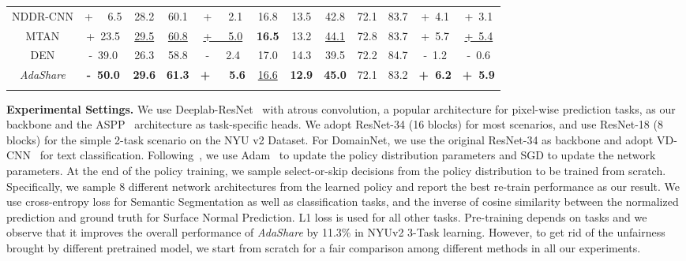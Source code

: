 \begin{table}
\begin{center}
{\begin{tabular}{c|c|ccc|cccccc|c}
            NDDR-CNN & \cellcolor{lightgray!15} + \ \ 6.5 & 28.2	& 60.1&\cellcolor{lightgray!15} +\ \ \ 2.1 & 16.8 & 13.5 & 42.8 & 72.1 
            & 83.7 & \cellcolor{lightgray!15} +\ 4.1 & \cellcolor{lightgray!15} +\ 3.1 \\
            MTAN &\cellcolor{lightgray!15} +\ 23.5 & \underline{29.5}	& \underline{60.8} &\cellcolor{lightgray!15}  \underline{+\ \ \ 5.0} &  \textbf{16.5} & 13.2 & \underline{44.1} & 72.8 & 83.7 & \cellcolor{lightgray!15} +\ 5.7 &\cellcolor{lightgray!15}  \underline{+\ 5.4} \\
            DEN & \cellcolor{lightgray!15} -\ 39.0 & 26.3 & 58.8 & \cellcolor{lightgray!15} -\ \ \  2.4 & 17.0 & 14.3 & 39.5 & 72.2 & 84.7 &\cellcolor{lightgray!15}  -\ 1.2 &\cellcolor{lightgray!15}  -\ 0.6 \\
            \hline
            \textit{AdaShare} &\cellcolor{lightgray!15} \textbf{-\ 50.0} & \textbf{29.6} & \textbf{61.3} & \cellcolor{lightgray!15} \textbf{+\ \ \ 5.6}& \underline{16.6} & \textbf{12.9} & \textbf{45.0} & 72.1 & 83.2 & \cellcolor{lightgray!15} \textbf{+\ 6.2} &\cellcolor{lightgray!15}  \textbf{+\ 5.9} \\
            \Xhline{3\arrayrulewidth} 
        \end{tabular}
        }
        \vspace{-3mm}
    \end{center}
\end{table} 
\noindent\textbf{Experimental Settings.} We use Deeplab-ResNet~\cite{chen2017deeplab} with atrous convolution, a popular architecture for pixel-wise prediction tasks, as our backbone and the ASPP~\cite{chen2017deeplab} architecture as task-specific heads. 
We adopt ResNet-34 (16 blocks) for most scenarios, and use ResNet-18 (8 blocks) for the simple 2-task scenario on the NYU v2 Dataset. For DomainNet, we use the original ResNet-34 as backbone and adopt VD-CNN~\cite{conneau2016very} for text classification.
Following~\cite{wu2019fbnet}, we use Adam~\cite{kingma2014adam} to update the policy distribution parameters and SGD to update the network parameters.
At the end of the policy training, we sample select-or-skip decisions from the policy distribution to be trained from scratch. 
Specifically, we sample 8 different network architectures from the learned policy and report the best re-train performance as our result. 
We use cross-entropy loss for Semantic Segmentation as well as classification tasks, and the inverse of cosine similarity between the normalized prediction and ground truth for Surface Normal Prediction. L1 loss is used for all other tasks. Pre-training depends on tasks and we observe that it improves the overall performance of \textit{AdaShare} by 11.3\% in NYUv2 3-Task learning. However, to get rid of the unfairness brought by different pretrained model, we start from scratch for a fair comparison among different methods in all our experiments. 

